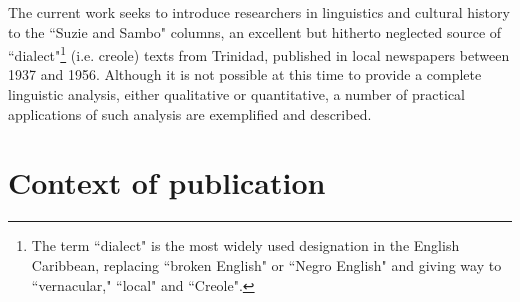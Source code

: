 \documentclass[output=paper,colorlinks,citecolor=brown]{langscibook}
\begin{document}
The current work seeks to introduce researchers in linguistics and cultural history to the ``Suzie and Sambo" columns, an excellent but hitherto neglected source of ``dialect"\footnote{ The term ``dialect" is the most widely used designation in the English Caribbean, replacing ``broken English" or ``Negro English" and giving way to ``vernacular," ``local" and ``Creole".} (i.e. creole) texts from Trinidad, published in local newspapers between 1937 and 1956. Although it is not possible at this time to provide a complete linguistic analysis, either qualitative or quantitative, a number of practical applications of such analysis are exemplified and described.


\section{Context of publication}
\largerpage
\end{document}
